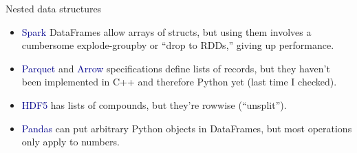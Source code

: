 \documentclass[aspectratio=169]{beamer}
\begin{document}
\begin{frame}{Nested data structures}
\large
\vspace{0.5 cm}
 \hfill {}

\vspace{0.75 cm}
\begin{itemize}\setlength{\itemsep}{0.35 cm}
\item<3-> \textcolor{darkblue}{Spark} DataFrames allow arrays of structs, but using them involves a cumbersome explode-groupby or ``drop to RDDs,'' giving up performance.
\item<4-> \textcolor{darkblue}{Parquet} and \textcolor{darkblue}{Arrow} specifications define lists of records, but they haven't been implemented in C++ and therefore Python yet (last time I checked).
\item<5-> \textcolor{darkblue}{HDF5} has lists of compounds, but they're rowwise (``unsplit'').
\item<6-> \textcolor{darkblue}{Pandas} can put arbitrary Python objects in DataFrames, but most operations only apply to numbers.
\end{itemize}
\end{frame}
\end{document}
